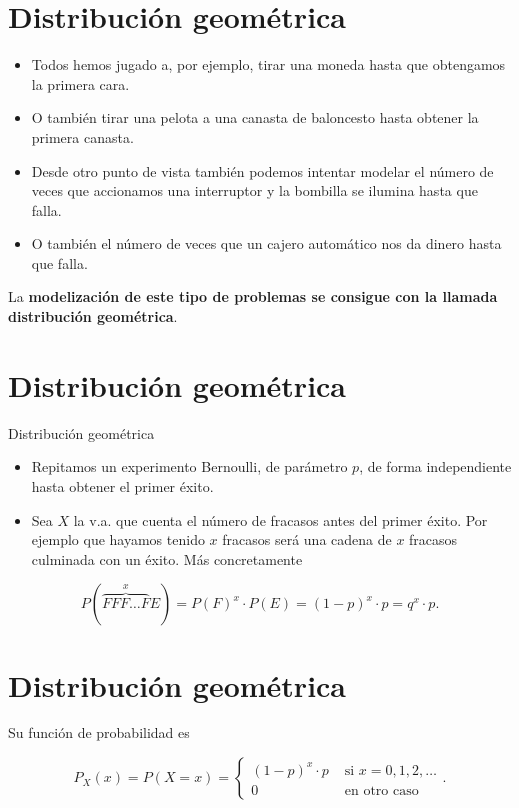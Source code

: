 \documentclass[
  letterpaper,
  DIV=11,
  numbers=noendperiod]{scrreprt}
\providecommand{\tightlist}{%
  \setlength{\itemsep}{0pt}\setlength{\parskip}{0pt}}\usepackage{longtable,booktabs,array}
\begin{document}
\section{Distribución geométrica}\label{distribuciuxf3n-geomuxe9trica}

\begin{itemize}
\item
  Todos hemos jugado a, por ejemplo, tirar una moneda hasta que
  obtengamos la primera cara.
\item
  O también tirar una pelota a una canasta de baloncesto hasta obtener
  la primera canasta.
\item
  Desde otro punto de vista también podemos intentar modelar el número
  de veces que accionamos una interruptor y la bombilla se ilumina hasta
  que falla.
\item
  O también el número de veces que un cajero automático nos da dinero
  hasta que falla.
\end{itemize}

La \textbf{modelización de este tipo de problemas se consigue con la
llamada distribución geométrica}.

\section{Distribución geométrica}\label{distribuciuxf3n-geomuxe9trica-1}

Distribución geométrica

\begin{itemize}
\tightlist
\item
  Repitamos un experimento Bernoulli, de parámetro \(p\), de forma
  independiente hasta obtener el primer éxito.
\item
  Sea \(X\) la v.a. que cuenta el número de fracasos antes del primer
  éxito. Por ejemplo que hayamos tenido \(x\) fracasos será una cadena
  de \(x\) fracasos culminada con un éxito. Más concretamente
\end{itemize}

\[P(\overbrace{FFF\ldots F}^{x}E)=P(F)^{x}\cdot P(E)=(1-p)^{x}\cdot p=q^{x}\cdot p.\]

\section{Distribución geométrica}\label{distribuciuxf3n-geomuxe9trica-2}

Su función de probabilidad es

\[
P_X(x)=P(X=x)=\left\{\begin{array}{ll}
(1-p)^{x}\cdot p & \mbox{ si } x=0,1,2,\ldots\\
0 &\mbox{ en otro caso}
\end{array}\right..
\]
\end{document}
